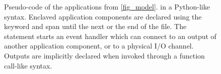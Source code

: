 \begin{figure}[ht]
  \begin{centering}
  \hfill
  \hfill
  \hfill\mbox{}
    \vspace{-2mm}
  \caption{ Pseudo-code of the applications from \cref{fig_model}. in a
    Python-like syntax. Enclaved application components are declared using the
     keyword and span until the next  or the end of
    the file. The  statement starts an event handler which can connect
    to an output of another application component, or to a physical I/O channel.
    Outputs are implicitly declared when invoked through a function call-like
    syntax. }
  \label{code:examples}
  \end{centering}
  \vspace{-3mm}
\end{figure}
